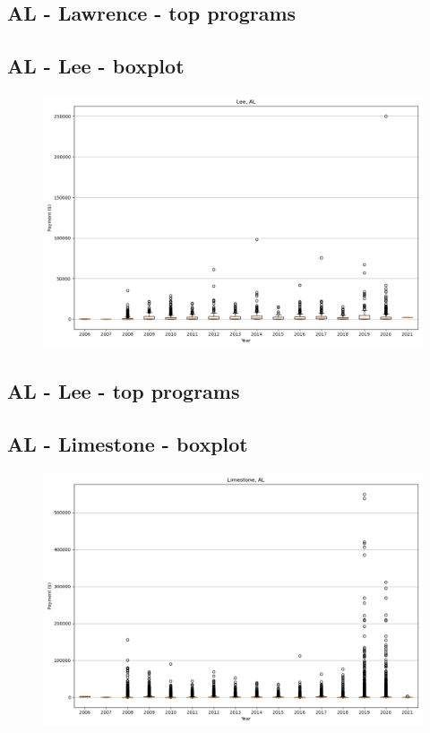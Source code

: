 \subsection*{AL - Lawrence - top programs}

\newpage
\subsection*{AL - Lee - boxplot}
\begin{figure}[h]
\centering
\includegraphics[width=7in]{../output/boxplots/counties/Lee-AL_boxplot.png}
\end{figure}


\subsection*{AL - Lee - top programs}

\newpage
\subsection*{AL - Limestone - boxplot}
\begin{figure}[h]
\centering
\includegraphics[width=7in]{../output/boxplots/counties/Limestone-AL_boxplot.png}
\end{figure}



